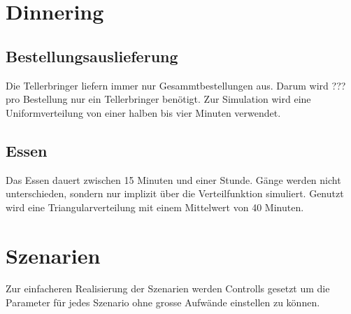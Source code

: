 \documentclass[ngerman,a4paper,12pt]{scrreprt}
\begin{document}
			
	\section{Dinnering}
		\subsection{Bestellungsauslieferung}					
			Die Tellerbringer liefern immer nur Gesammtbestellungen aus. Darum wird ??? pro Bestellung nur ein Tellerbringer benötigt. Zur Simulation wird eine Uniformverteilung von einer halben bis vier Minuten verwendet.


		\subsection{Essen}
			Das Essen dauert zwischen 15 Minuten und einer Stunde. Gänge werden nicht unterschieden, sondern nur implizit über die Verteilfunktion simuliert. Genutzt wird eine Triangularverteilung mit einem Mittelwert von 40 Minuten.\\
			
	\section{Szenarien}
		Zur einfacheren Realisierung der Szenarien werden Controlls gesetzt um die Parameter für jedes Szenario ohne grosse Aufwände einstellen zu können.\\
		
			
			
			
\end{document}

